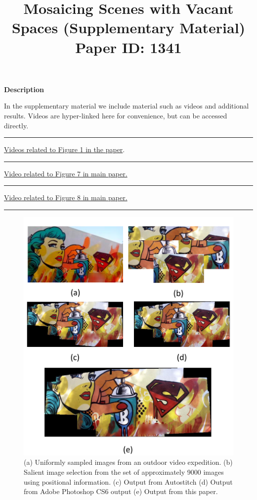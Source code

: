 \documentclass[10pt,twocolumn,letterpaper]{article}
\begin{document}
\title{Mosaicing Scenes with Vacant Spaces (Supplementary Material)  \\ Paper
ID: 1341 }

\maketitle

\textbf{Description}

In the supplementary material we include material such as videos and additional results.
Videos are hyper-linked here for convenience, but can be accessed directly.

\hrule

\href{videos/teaser.avi}{Videos related to Figure 1 in the paper}.

\hrule
\href{videos/lady1.avi} {Video related to Figure 7 in main paper.}

\hrule

\href{videos/greenRed.avi} {Video related to Figure 8 in main paper.}

\hrule

\begin{figure}[h!]
\centering
\includegraphics[width=0.87\linewidth]{figures/lady2.pdf}
\caption{ (a) Uniformly sampled images from an outdoor video
  expedition.  (b) Salient image selection from the set of
  approximately 9000 images using positional information. (c) Output from Autostitch \cite{referhere}
  (d) Output from Adobe Photoshop CS6 output (e) Output from this paper.}
\label{fig:validResults}
\end{figure}
\end{document}
